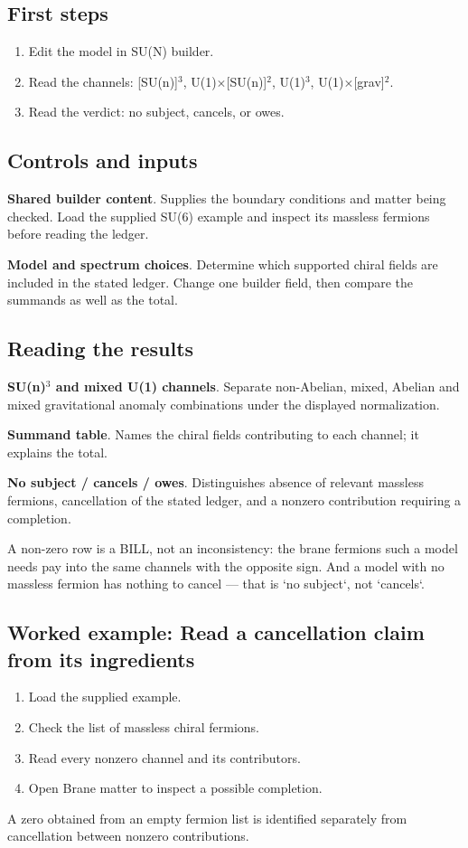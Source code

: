 \documentclass[11pt,a4paper]{article}
\begin{document}
\subsection*{First steps}
\begin{enumerate}
\item Edit the model in SU(N) builder.
\item Read the channels: [SU(n)]\ensuremath{{}^{3}}, U(1)\ensuremath{\times}[SU(n)]\ensuremath{{}^{2}}, U(1)\ensuremath{{}^{3}}, U(1)\ensuremath{\times}[grav]\ensuremath{{}^{2}}.
\item Read the verdict: no subject, cancels, or owes.
\end{enumerate}
\subsection*{Controls and inputs}
\textbf{Shared builder content}. Supplies the boundary conditions and matter being checked. Load the supplied SU(6) example and inspect its massless fermions before reading the ledger.

\textbf{Model and spectrum choices}. Determine which supported chiral fields are included in the stated ledger. Change one builder field, then compare the summands as well as the total.

\subsection*{Reading the results}
\textbf{SU(n)\ensuremath{{}^{3}} and mixed U(1) channels}. Separate non-Abelian, mixed, Abelian and mixed gravitational anomaly combinations under the displayed normalization.

\textbf{Summand table}. Names the chiral fields contributing to each channel; it explains the total.

\textbf{No subject / cancels / owes}. Distinguishes absence of relevant massless fermions, cancellation of the stated ledger, and a nonzero contribution requiring a completion.

A non-zero row is a BILL, not an inconsistency: the brane fermions such a model needs pay into the same channels with the opposite sign. And a model with no massless fermion has nothing to cancel --- that is `no subject`, not `cancels`.
\subsection*{Worked example: Read a cancellation claim from its ingredients}
\begin{enumerate}
\item Load the supplied example.
\item Check the list of massless chiral fermions.
\item Read every nonzero channel and its contributors.
\item Open Brane matter to inspect a possible completion.
\end{enumerate}
A zero obtained from an empty fermion list is identified separately from cancellation between nonzero contributions.
\end{document}
